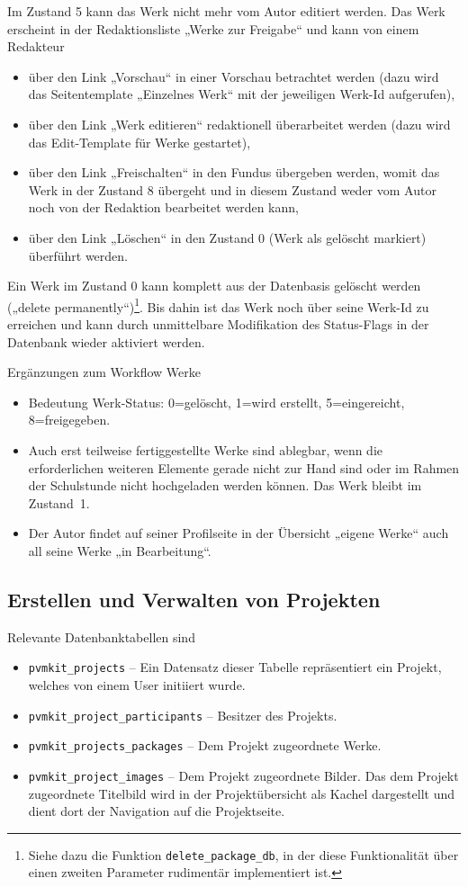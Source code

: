 \documentclass[a4paper,11pt]{article}
\begin{document}
Im Zustand 5 kann das Werk nicht mehr vom Autor editiert werden. Das Werk
erscheint in der Redaktionsliste „Werke zur Freigabe“ und kann von einem
Redakteur
\begin{itemize}\itemsep0pt
\item über den Link „Vorschau“ in einer Vorschau betrachtet werden (dazu wird
  das Seitentemplate „Einzelnes Werk“ mit der jeweiligen Werk-Id aufgerufen), 
\item über den Link „Werk editieren“ redaktionell überarbeitet werden (dazu
  wird das Edit-Template für Werke gestartet),
\item über den Link „Freischalten“ in den Fundus übergeben werden, womit das
  Werk in der Zustand 8 übergeht und in diesem Zustand weder vom Autor noch von
  der Redaktion bearbeitet werden kann, 
\item über den Link „Löschen“ in den Zustand 0 (Werk als gelöscht markiert)
  überführt werden.
\end{itemize}
Ein Werk im Zustand 0 kann komplett aus der Datenbasis gelöscht werden („delete
permanently“)\footnote{Siehe dazu die Funktion \texttt{delete\_package\_db}, in
  der diese Funktionalität über einen zweiten Parameter rudimentär
  implementiert ist.}.  Bis dahin ist das Werk noch über seine Werk-Id zu
erreichen und kann durch unmittelbare Modifikation des Status-Flags in der
Datenbank wieder aktiviert werden.

Ergänzungen zum Workflow Werke
\begin{itemize}\itemsep0pt
\item Bedeutung Werk-Status: 0=gelöscht, 1=wird erstellt, 5=eingereicht,
  8=freigegeben.
\item Auch erst teilweise fertiggestellte Werke sind ablegbar, wenn die
  erforderlichen weiteren Elemente gerade nicht zur Hand sind oder im Rahmen
  der Schulstunde nicht hochgeladen werden können.  Das Werk bleibt im
  Zustand~1. 
\item Der Autor findet auf seiner Profilseite in der Übersicht „eigene Werke“
  auch all seine Werke „in Bearbeitung“.
\end{itemize}

\subsection{Erstellen und Verwalten von Projekten}
 
Relevante Datenbanktabellen sind    
\begin{itemize} \itemsep0pt
\item \texttt{pvmkit\_projects} -- Ein Datensatz dieser Tabelle repräsentiert
  ein Projekt, welches von einem User initiiert wurde.
\item \texttt{pvmkit\_project\_participants} -- Besitzer des Projekts. 
\item \texttt{pvmkit\_projects\_packages} -- Dem Projekt zugeordnete Werke.
\item \texttt{pvmkit\_project\_images} -- Dem Projekt zugeordnete Bilder.  Das
  dem Projekt zugeordnete Titelbild wird in der Projektübersicht als Kachel
  dargestellt und dient dort der Navigation auf die Projektseite.
\end{itemize}
 
\end{document}
